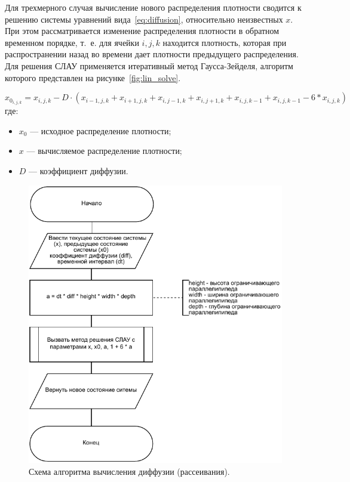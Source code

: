  Для трехмерного случая вычисление нового распределения плотности сводится к решению системы уравнений вида~\ref{eq:diffusion}, относительно неизвестных $x$. При этом рассматривается изменение распределения плотности в обратном временном порядке, т.~е. для ячейки $i, j, k$ находится плотность, которая при распространении назад во времени дает плотности предыдущего распределения. Для решения СЛАУ применяется итеративный метод Гаусса-Зейделя, алгоритм которого представлен на рисунке~\ref{fig:lin_solve}.

\begin{equation}
	\label{eq:diffusion}
	x_{0_{i,j,k}} = x_{i,j,k} - D \cdot (x_{i-1,j, k}+x_{i+1,j, k}+x_{i,j-1, k}+x_{i,j+1, k}+x_{i, j, k-1}+x_{i, j, k-1}-6*x_{i,j, k})
\end{equation}
где:
\begin{itemize}
	\item $x_0$ --- исходное распределение плотности;
	\item $x$ --- вычисляемое распределение плотности;
	\item $D$ --- коэффициент диффузии.
\end{itemize}

\begin{figure}[H]
	\centering
	\includegraphics[width=1.0\textwidth,page=1]{assets/img/diffuse.pdf}
	\caption{Схема алгоритма вычисления диффузии (рассеивания).}
	\label{fig:diffuse}
\end{figure}

